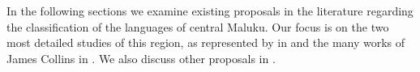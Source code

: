 \newpage
{}
In the following sections we examine existing proposals in the
literature regarding the classification of the languages of central Maluku.
Our focus is on the two most detailed studies of this region,
as represented by \citet{Stresemann1927} in 
and the many works of James Collins in .
We also discuss other proposals in .
